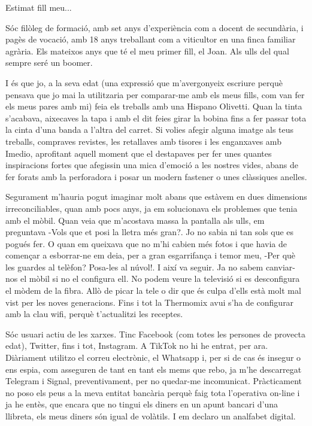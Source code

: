 Estimat fill meu...

Sóc filòleg de formació, amb set anys d'experiència com a docent de secundària, i pagès de vocació, amb 18 anys treballant com a viticultor en una finca familiar agrària. Els mateixos anys que té el meu primer fill, el Joan. Als ulls del qual sempre seré un boomer.

I és que jo, a la seva edat (una expressió que m'avergonyeix escriure perquè pensava que jo mai la utilitzaria per comparar-me amb els meus fills, com van fer els meus pares amb mi) feia els treballs amb una Hispano Olivetti. Quan la tinta s'acabava, aixecaves la tapa i amb el dit feies girar la bobina fins a fer passar tota la cinta d'una banda a l'altra del carret. Si volies afegir alguna imatge als teus treballs, compraves revistes, les retallaves amb tisores i les enganxaves amb Imedio, aprofitant aquell moment que el destapaves per fer unes quantes inspiracions fortes que afegissin una mica d'emoció a les nostres vides, abans de fer forats amb la perforadora i posar un modern fastener o unes clàssiques anelles.

Segurament m'hauria pogut imaginar molt abans que estàvem en dues dimensions irreconciliables, quan amb pocs anys, ja em solucionava els problemes que tenia amb el mòbil. Quan veia que m'acostava massa la pantalla als ulls, em preguntava -Vols que et posi la lletra més gran?. Jo no sabia ni tan sols que es pogués fer. O quan em queixava que no m'hi cabien més fotos i que havia de començar a esborrar-ne em deia, per a gran esgarrifança i temor meu, -Per què les guardes al telèfon? Posa-les al núvol!. I així va seguir. Ja no sabem canviar-nos el mòbil si no el configura ell. No podem veure la televisió si es desconfigura el mòdem de la fibra. Allò de picar la tele o dir que és culpa d'ells està molt mal vist per les noves generacions. Fins i tot la Thermomix avui s'ha de configurar amb la clau wifi, perquè t'actualitzi les receptes.

Sóc usuari actiu de les xarxes. Tinc Facebook (com totes les persones de provecta edat), Twitter, fins i tot, Instagram. A TikTok no hi he entrat, per ara. Diàriament utilitzo el correu electrònic, el Whatsapp i, per si de cas és insegur o ens espia, com asseguren de tant en tant els mems que rebo, ja m'he descarregat Telegram i Signal, preventivament, per no quedar-me incomunicat. Pràcticament no poso els peus a la meva entitat bancària perquè faig tota l'operativa on-line i ja he entès, que encara que no tingui els diners en un apunt bancari d'una llibreta, els meus diners són igual de volàtils. I em declaro un analfabet digital.

